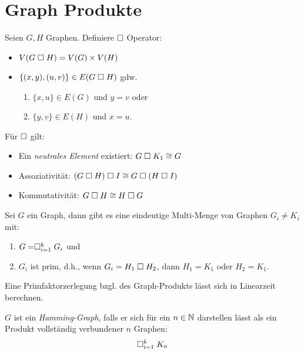 \chapter{Graph Produkte}

\begin{definition}[Produkt]
    Seien $ G, H $ Graphen.
    Definiere $ \mathrel{\square} $ Operator:
    \begin{itemize}
        \item $ V(G \mathrel{\square} H) = V(G) \times V(H) $
        \item $ \{ (x, y), (u, v) \} \in E(G \mathrel{\square} H) $ gdw. \begin{enumerate}
            \item $ \{ x, u \} \in E(G) $ und $ y = v $ oder
            \item $ \{ y, v \} \in E(H) $ und $ x = u $.
        \end{enumerate}
    \end{itemize}
\end{definition}

\begin{proposition}
    Für $ \mathrel{\square} $ gilt:
    \begin{itemize}
        \item Ein \textit{neutrales Element} existiert: $ G \mathrel{\square} K_1 \cong G $
        \item Assoziativität: $ (G \mathrel{\square} H) \mathrel{\square} I \cong G \mathrel{\square} (H \mathrel{\square} I) $
        \item Kommutativität: $ G \mathrel{\square} H \cong H \mathrel{\square} G $
    \end{itemize}
\end{proposition}

\begin{theorem}
    Sei $ G $ ein Graph, dann gibt es eine eindeutige Multi-Menge von Graphen $ G_i \neq K_i $ mit:
    \begin{enumerate}
        \item $ G = \mathrel{\square}^k_{i = 1} G_i $ und
        \item $ G_i $ ist prim, d.h., wenn $ G_i = H_1 \mathrel{\square} H_2 $, dann $ H_1 = K_1 $ oder $ H_2 = K_1 $.
    \end{enumerate}
\end{theorem}

\begin{remark}
    Eine Primfaktorzerlegung bzgl. des Graph-Produkts lässt sich in Linearzeit berechnen.
\end{remark}

\begin{definition}
    $ G $ ist ein \textit{Hamming-Graph}, falls er sich für ein $ n \in \mathbb{N} $ darstellen lässt als ein Produkt vollständig verbundener $ n $ Graphen:
    \begin{equation*}
        \mathrel{\square}^k_{i = 1} K_n
    \end{equation*}
\end{definition}


